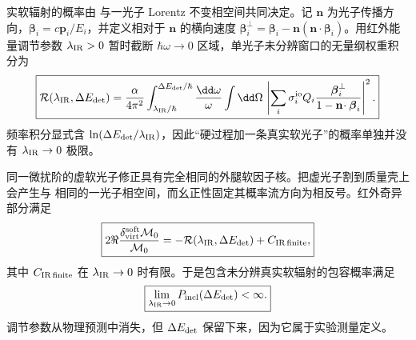 实软辐射的概率由 与一光子 Lorentz 不变相空间共同决定。记 $\mathbf n$ 为光子传播方向，$\boldsymbol\beta_i=c\mathbf p_i/E_i$，并定义相对于 $\mathbf n$ 的横向速度
$\boldsymbol\beta_i^\perp=\boldsymbol\beta_i-\mathbf n(\mathbf n\!\cdot\boldsymbol\beta_i)$。用红外能量调节参数 $\lambda_{\rm IR}>0$ 暂时截断 $\hbar\omega\to0$ 区域，单光子未分辨窗口的无量纲权重积分为
\begin{equation}
 \boxed{
 \mathcal R(\lambda_{\rm IR},\Delta E_{\rm det})
 =\frac{\alpha}{4\pi^2}
 \int_{\lambda_{\rm IR}/\hbar}^{\Delta E_{\rm det}/\hbar}
 \frac{\dd\omega}{\omega}
 \int\dd\Omega\,
 \left|
 \sum_i\sigma_i^{\rm io}Q_i
 \frac{\boldsymbol\beta_i^\perp}
 {1-\mathbf n\!\cdot\boldsymbol\beta_i}
 \right|^2.}
 \label{eq:soft-radiator-definition-dp10}
\end{equation}
频率积分显式含 $\ln(\Delta E_{\rm det}/\lambda_{\rm IR})$，因此“硬过程加一条真实软光子”的概率单独并没有 $\lambda_{\rm IR}\to0$ 极限。

同一微扰阶的虚软光子修正具有完全相同的外腿软因子核。把虚光子割到质量壳上会产生与 相同的一光子相空间，而幺正性固定其概率流方向为相反号。红外奇异部分满足
\begin{equation}
 \boxed{
 2\Re\frac{\delta_{\rm virt}^{\rm soft}\mathcal M_0}{\mathcal M_0}
 =-\mathcal R(\lambda_{\rm IR},\Delta E_{\rm det})
 +C_{\rm IR\,finite},}
 \label{eq:virtual-real-ir-relation-dp10}
\end{equation}
其中 $C_{\rm IR\,finite}$ 在 $\lambda_{\rm IR}\to0$ 时有限。于是包含未分辨真实软辐射的包容概率满足
\begin{equation}
 \boxed{
 \lim_{\lambda_{\rm IR}\to0}
 P_{\rm incl}(\Delta E_{\rm det})<\infty.}
 \label{eq:bloch-nordsieck-cancellation-dp10}
\end{equation}
调节参数从物理预测中消失，但 $\Delta E_{\rm det}$ 保留下来，因为它属于实验测量定义。

